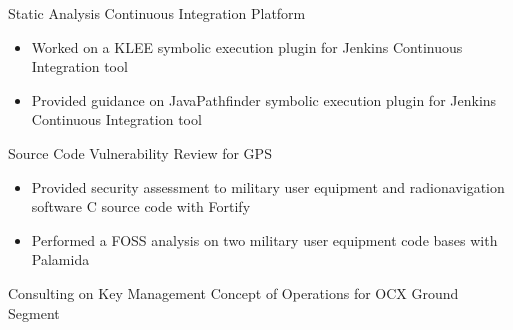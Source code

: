 \documentclass{clinton-resume} %
\begin{document}
\begin{minipage}[t]{0.66\textwidth}
\vspace{\topsep} %
\begin{tightitemize}
    \item Static Analysis Continuous Integration Platform
        \begin{itemize}
            \item Worked on a KLEE symbolic execution plugin for Jenkins Continuous Integration tool
            \item Provided guidance on JavaPathfinder symbolic execution plugin for Jenkins Continuous Integration tool
        \end{itemize}
    \item Source Code Vulnerability Review for GPS
        \begin{itemize}
            \item Provided security assessment to military user equipment and radionavigation software C source code with Fortify
            \item Performed a FOSS analysis on two military user equipment code bases with Palamida
        \end{itemize}
    \item Consulting on Key Management Concept of Operations for OCX Ground Segment
        
\end{tightitemize}



\end{minipage}
\end{document}
